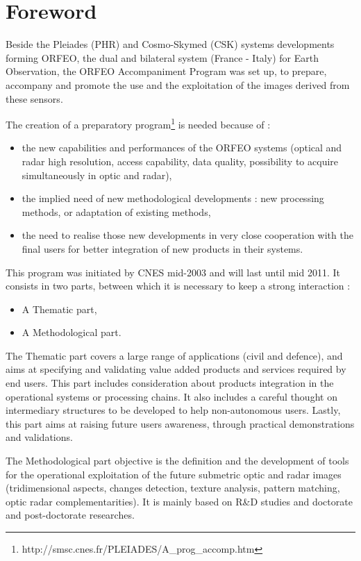 \chapter*{Foreword}
\noindent


Beside the Pleiades (PHR) and Cosmo-Skymed (CSK) systems developments forming ORFEO, the dual and bilateral system (France - Italy) for Earth Observation, the ORFEO Accompaniment Program was set up, to prepare, accompany and promote the use and the exploitation of the images derived from these sensors.

The creation of a preparatory program\footnote{http://smsc.cnes.fr/PLEIADES/A\_prog\_accomp.htm} is needed because of :
\begin{itemize}
\item the new capabilities and performances of the ORFEO systems (optical and radar high resolution, access capability, data quality, possibility to acquire simultaneously in optic and radar),
\item the implied need of new methodological developments : new processing methods, or adaptation of existing methods,
\item the need to realise those new developments in very close
  cooperation with the final users for better integration of new
  products in their systems.

\end{itemize}

This program was initiated by CNES mid-2003 and will last until mid 2011.
It consists in two parts, between which it is necessary to keep a strong interaction :
\begin{itemize}
\item A Thematic part,
\item A Methodological part.
\end{itemize}

The Thematic part covers a large range of applications (civil and
defence), and aims at specifying and validating value added
products and services required by end users. This part includes
consideration about products integration in the operational systems or
processing chains. It also includes a careful thought on intermediary
structures to be developed to help non-autonomous users. Lastly, this part aims at raising future users awareness, through practical demonstrations and validations.

The Methodological part objective is the definition and the
development of tools for the operational exploitation of the future
submetric optic and radar images (tridimensional aspects, changes
detection, texture analysis, pattern matching, optic radar
complementarities). It is mainly based on R\&D studies and doctorate
and post-doctorate researches.

